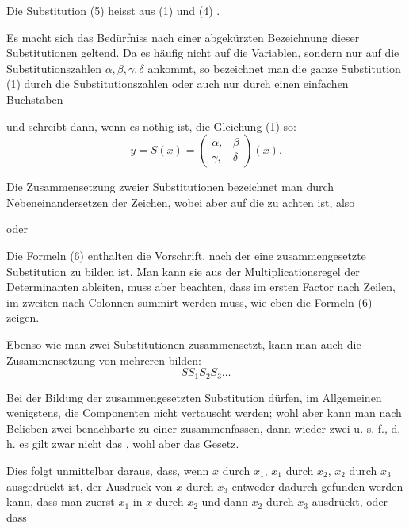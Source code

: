 
Die Substitution (5) heisst aus (1) und (4) .

Es macht sich das Bedürfniss nach einer abgekürzten Bezeichnung
 dieser Substitutionen geltend. Da es häufig nicht auf
die Variablen, sondern nur auf die Substitutionszahlen $\alpha, \beta, \gamma, \delta$
ankommt, so bezeichnet man die ganze Substitution (1) durch
die Substitutionszahlen oder auch nur durch einen einfachen
Buchstaben

und schreibt dann, wenn es nöthig ist, die Gleichung (1) so:
\[
y = S(x) = \begin{pmatrix} \alpha, & \beta \\ \gamma, & \delta \end{pmatrix}(x).
\]

Die Zusammensetzung zweier Substitutionen bezeichnet man
durch Nebeneinandersetzen der Zeichen, wobei aber auf die
 zu achten ist, also

oder

Die Formeln (6) enthalten die Vorschrift, nach der eine
zusammengesetzte Substitution zu bilden ist. Man kann sie aus
der Multiplicationsregel der Determinanten ableiten, muss aber
beachten, dass im ersten Factor nach Zeilen, im zweiten nach
Colonnen summirt werden muss, wie eben die Formeln (6) zeigen.

Ebenso wie man zwei Substitutionen zusammensetzt, kann
man auch die Zusammensetzung von mehreren bilden:
\[
S S_1 S_2 S_3 \ldots
\]

Bei der Bildung der zusammengesetzten Substitution dürfen,
im Allgemeinen wenigstens, die Componenten nicht vertauscht
werden; wohl aber kann man nach Belieben zwei benachbarte
zu einer zusammenfassen, dann wieder zwei u. s. f., d. h. es gilt
zwar nicht das , wohl aber das 
Gesetz.

Dies folgt unmittelbar daraus, dass, wenn $x$ durch $x_1$, $x_1$
durch $x_2$, $x_2$ durch $x_3$ ausgedrückt ist, der Ausdruck von $x$ durch
$x_3$ entweder dadurch gefunden werden kann, dass man zuerst
$x_1$ in $x$ durch $x_2$ und dann $x_2$ durch $x_3$ ausdrückt, oder dass

